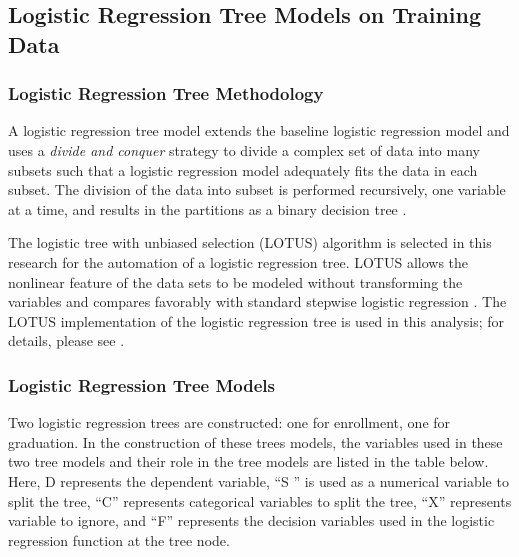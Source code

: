 \documentclass[12pt,english]{report}
\begin{document}
\subsection{Logistic Regression Tree Models on Training Data }
\subsubsection{Logistic Regression Tree Methodology }
A logistic regression tree model extends the baseline logistic regression  model and uses a \textit{divide and conquer} strategy to divide a complex set 
of data into many subsets such that a logistic regression model adequately fits the data in each subset. The division of the data into subset is  performed recursively, one variable at a time, and results in the partitions as a binary decision tree \citep{harrell2013regression_book}.

The logistic tree with unbiased selection (LOTUS) algorithm \citep{lotus2}  is  selected in this research for the automation of a logistic regression tree. 
LOTUS allows the nonlinear feature of the data sets to be modeled without  transforming the variables and compares favorably with standard stepwise 
logistic regression \citep{lotus_app1,lotus_app2}. The LOTUS implementation of the logistic regression tree is used in this analysis; for details, please see \citep{lotus2}.

\subsubsection{Logistic Regression Tree Models }
Two logistic regression trees are constructed: one for  enrollment, one for graduation.  In the construction of these trees models, the variables used in these two tree models and their role in the tree models  are listed in the table below. Here, D represents the dependent variable, ``S '' is 
used as a numerical variable to split the tree, ``C'' represents categorical  variables to split the tree, ``X'' represents variable to ignore, and ``F'' represents the decision variables used in the 
logistic regression function at the tree node. 
\end{document}
